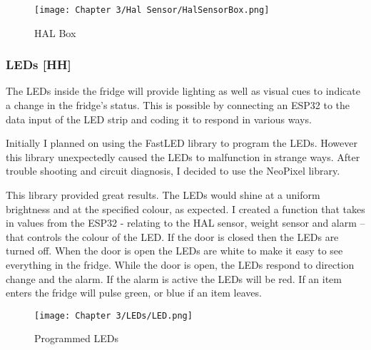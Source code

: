 \begin{figure}[H]        
    \centering
    \texttt{[image: Chapter 3/Hal Sensor/HalSensorBox.png]}
    \caption{HAL Box}
    \label{fig:haldoor}
\end{figure} 

\subsubsection{LEDs [HH]}

The LEDs inside the fridge will provide lighting as well as visual cues to indicate a change in the fridge’s status.
This is possible by connecting an ESP32 to the data input of the LED strip and coding it to respond in various ways. 

Initially I planned on using the FastLED library to program the LEDs.
However this library unexpectedly caused the LEDs to malfunction in strange ways.
After trouble shooting and circuit diagnosis, I decided to use the NeoPixel library. 

This library provided great results.
The LEDs would shine at a uniform brightness and at the specified colour, as expected.
I created a function that takes in values from the ESP32 - relating to the HAL sensor, weight sensor and alarm – that controls the colour of the LED.
If the door is closed then the LEDs are turned off.
When the door is open the LEDs are white to make it easy to see everything in the fridge.
While the door is open, the LEDs respond to direction change and the alarm.
If the alarm is active the LEDs will be red.
If an item enters the fridge will pulse green, or blue if an item leaves. 

\begin{figure}[H]        
    \centering
    \texttt{[image: Chapter 3/LEDs/LED.png]}
    \caption{Programmed LEDs}
\end{figure} 